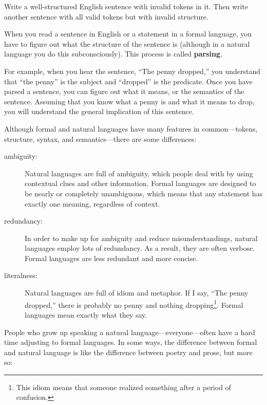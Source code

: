 \documentclass[10pt]{book}
\begin{document}
\begin{ex}
Write a well-structured English
sentence with invalid tokens in it.  Then write another sentence
with all valid tokens but with invalid structure.
\end{ex}

When you read a sentence in English or a statement in a formal
language, you have to figure out what the structure of the sentence is
(although in a natural language you do this subconsciously).  This
process is called {\bf parsing}.


For example, when you hear the sentence, ``The penny dropped,'' you
understand that ``the penny'' is the subject and ``dropped'' is the
predicate.  Once you have parsed a sentence, you can figure out what it
means, or the semantics of the sentence.  Assuming that you know
what a penny is and what it means to drop, you will understand the
general implication of this sentence.

Although formal and natural languages have many features in
common---tokens, structure, syntax, and semantics---there are some
differences:


\begin{description}

\item[ambiguity:] Natural languages are full of ambiguity, which
people deal with by using contextual clues and other information.
Formal languages are designed to be nearly or completely unambiguous,
which means that any statement has exactly one meaning,
regardless of context.

\item[redundancy:] In order to make up for ambiguity and reduce
misunderstandings, natural languages employ lots of
redundancy.  As a result, they are often verbose.  Formal languages
are less redundant and more concise.

\item[literalness:] Natural languages are full of idiom and metaphor.
If I say, ``The penny dropped,'' there is probably no penny and
nothing dropping\footnote{This idiom means that someone realized something
after a period of confusion.}.  Formal languages
mean exactly what they say.

\end{description}

People who grow up speaking a natural language---everyone---often have a
hard time adjusting to formal languages.  In some ways, the difference
between formal and natural language is like the difference between
poetry and prose, but more so:
\end{document}
